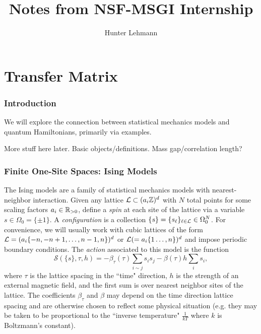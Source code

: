 \documentclass[10pt,reqno]{amsart}
\numberwithin{equation}{section}
\begin{document}
	
	\title{Notes from NSF-MSGI Internship}
	\author{Hunter Lehmann}
	\maketitle

\tableofcontents

	\part{Transfer Matrix}
	\section{Introduction}
	
	We will explore the connection between statistical mechanics models and quantum Hamiltonians, primarily via examples. 
	
	More stuff here later. Basic objects/definitions.
	Mass gap/correlation length?
	
	\section{Finite One-Site Spaces: Ising Models}
	
	The Ising models are a family of statistical mechanics models with nearest-neighbor interaction. 
	Given any lattice $\mathcal{L} \subset (a_i\mathbb{Z})^d$ with $N$ total points for some scaling factors $a_i \in \mathbb{R}_{>0}$, define a \emph{spin} at each site of the lattice via a variable $s \in \Omega_0=\{\pm 1\}$. 
	A \emph{configuration} is a collection $\{s\}=\{s_\ell\}_{\ell\in\mathcal{L}} \in \Omega_0^N$. 
	For convenience, we will usually work with cubic lattices of the form $\mathcal{L}=(a_i\{-n,-n+1,\ldots, n-1,n\})^d$ or $\mathcal{L}(=a_i\{1\ldots, n\})^d$ and impose periodic boundary conditions. 
	The \emph{action} associated to this model is the function 
	\[\mathcal{S}(\{s\},\tau, h)=-\beta_\tau(\tau)\sum_{i\sim j} s_is_j - \beta(\tau)h\sum_{i}s_i , \] 
	where $\tau$ is the lattice spacing in the ``time" direction, $h$ is the strength of an external magnetic field, and the first sum is over nearest neighbor sites of the lattice. 
	The coefficients $\beta_\tau$ and $\beta$ may depend on the time direction lattice spacing and are otherwise chosen to reflect some physical situation (e.g. they may be taken to be proportional to the ``inverse temperature" $\frac{1}{kT}$ where $k$ is Boltzmann's constant).
	
\end{document}
